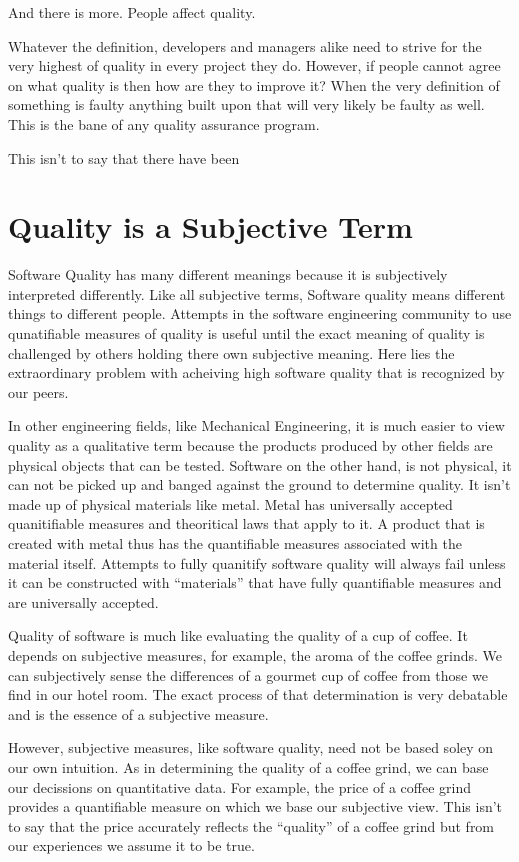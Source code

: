 And there is more. People affect quality. 

Whatever the definition, developers and managers alike need to strive for
the very highest of quality in every project they do. However, if people
cannot agree on what quality is then how are they to improve it? When the
very definition of something is faulty anything built upon that will very
likely be faulty as well. This is the bane of any quality assurance
program. 

This isn't to say that there have been 

\section{Quality is a Subjective Term}
Software Quality has many different meanings because it is subjectively
interpreted differently. Like all subjective terms, Software quality means
different things to different people.  Attempts in the software engineering
community to use qunatifiable measures of quality is useful until the exact
meaning of quality is challenged by others holding there own subjective
meaning. Here lies the extraordinary problem with acheiving high software
quality that is recognized by our peers.

In other engineering fields, like Mechanical Engineering, it is much easier
to view quality as a qualitative term because the products produced by
other fields are physical objects that can be tested. Software on the other
hand, is not physical, it can not be picked up and banged against the
ground to determine quality. It isn't made up of physical materials like
metal. Metal has universally accepted quanitifiable measures and
theoritical laws that apply to it. A product that is created with metal
thus has the quantifiable measures associated with the material itself.
Attempts to fully quanitify software quality will always fail unless it can
be constructed with ``materials'' that have fully quantifiable measures and
are universally accepted.

Quality of software is much like evaluating the quality of a cup of coffee.
It depends on subjective measures, for example, the aroma of the coffee
grinds. We can subjectively sense the differences of a gourmet cup of
coffee from those we find in our hotel room. The exact process of that
determination is very debatable and is the essence of a subjective measure.

However, subjective measures, like software quality, need not be based
soley on our own intuition. As in determining the quality of a coffee grind, 
we can base our decissions on quantitative data. For example, the price of
a coffee grind provides a quantifiable measure on which we base our
subjective view. This isn't to say that the price accurately reflects the
``quality'' of a coffee grind but from our experiences we assume it to be true.

